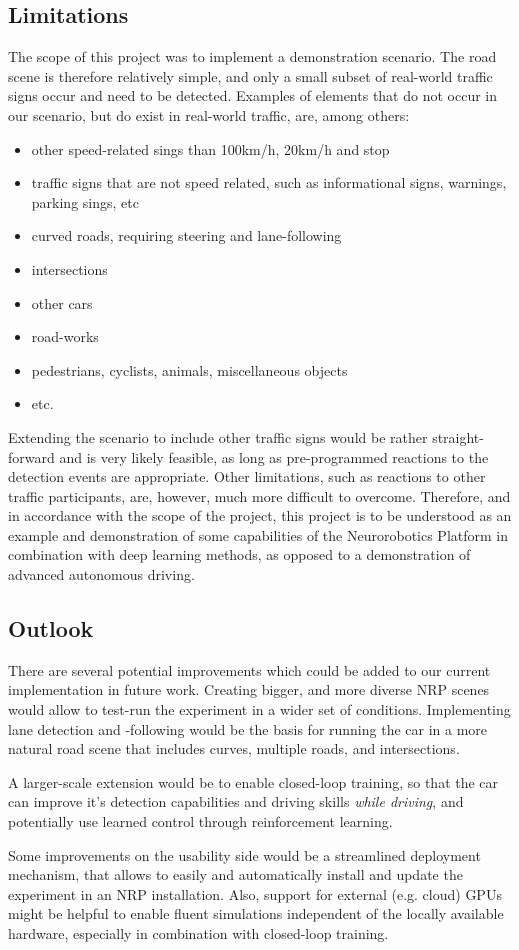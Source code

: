 \subsection{Limitations}
The scope of this project was to implement a demonstration scenario. 
The road scene is therefore relatively simple, and only a small subset of real-world traffic signs occur and need to be detected. 
Examples of elements that do not occur in our scenario, but do exist in real-world traffic, are, among others:
\begin{itemize}
 \item other speed-related sings than 100km/h, 20km/h and stop
 \item traffic signs that are not speed related, such as informational signs, warnings, parking sings, etc
 \item curved roads, requiring steering and lane-following
 \item intersections
 \item other cars
 \item road-works
 \item pedestrians, cyclists, animals, miscellaneous objects
 \item etc.
\end{itemize}

Extending the scenario to include other traffic signs would be rather straight-forward and is very likely feasible, as long as pre-programmed reactions to the detection events are appropriate. 
Other limitations, such as reactions to other traffic participants, are, however, much more difficult to overcome.
Therefore, and in accordance with the scope of the project, this project is to be understood as an example and demonstration of some capabilities of the Neurorobotics Platform in combination with deep learning methods, as opposed to a demonstration of advanced autonomous driving.

\subsection{Outlook}
There are several potential improvements which could be added to our current implementation in future work. 
Creating bigger, and more diverse NRP scenes would allow to test-run the experiment in a wider set of conditions.
Implementing lane detection and -following would be the basis for running the car in a more natural road scene that includes curves, multiple roads, and intersections. 

A larger-scale extension would be to enable closed-loop training, so that the car can improve it's detection capabilities and driving skills \emph{while driving}, and potentially use learned control through reinforcement learning.

Some improvements on the usability side would be a streamlined deployment mechanism, that allows to easily and automatically install and update the experiment in an NRP installation. Also, support for external (e.g. cloud) GPUs might be helpful to enable fluent simulations independent of the locally available hardware, especially in combination with closed-loop training.
